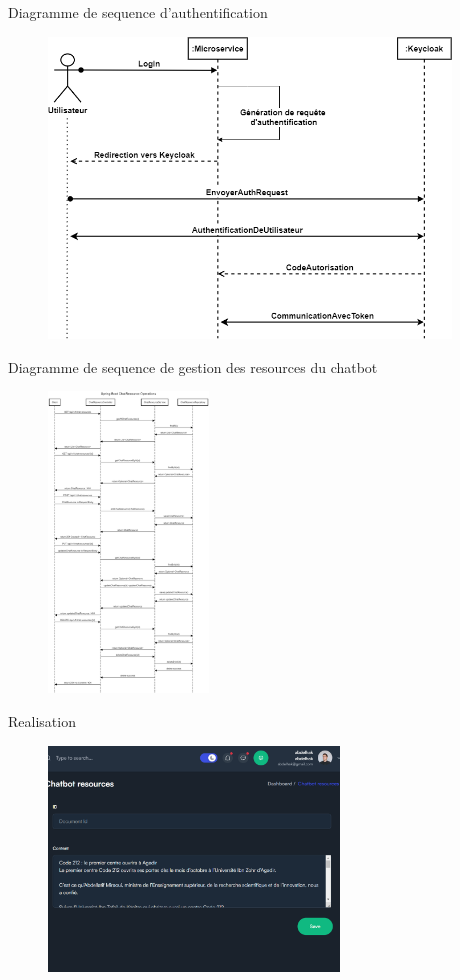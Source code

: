 \documentclass{beamer}
\begin{document}
\begin{frame}{Diagramme de sequence d'authentification}
\begin{figure}[htpb]
        \centering
        \includegraphics[height=8cm]{pic/keycloak-seq.png}
\end{figure}
\end{frame}

\begin{frame}{Diagramme de sequence de gestion des resources du chatbot}
\begin{figure}[htpb]
        \centering
        \includegraphics[height=8cm]{pic/chat-res-seq.png}
\end{figure}
\end{frame}

\begin{frame}{Realisation}
\begin{figure}[htpb]
        \centering
        \includegraphics[height=6cm]{pic/admin-doc.png}
\end{figure}
\end{frame}
\end{document}

